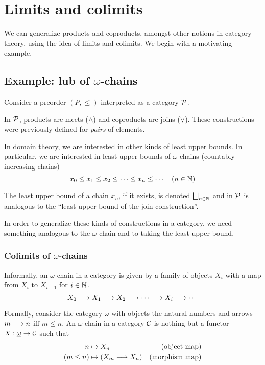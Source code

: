 \chapter{Limits and colimits}

We can generalize products and coproducts, amongst other notions in category
theory, using the idea of limits and colimits. We begin with a motivating
example.

\section{Example: lub of $\omega$-chains}

Consider a preorder $(P, \leq)$ interpreted as a category  $\mathcal{P}$.

In $\mathcal{P}$,  products are meets ($\wedge$) and coproducts are joins
($\vee$). These constructions were previously defined for \emph{pairs} of
elements.

In domain theory, we are interested in other kinds of least upper bounds. In
particular, we are interested in least upper bounds of $\omega$-chains
(countably increasing chains)
\[
	x_0 \leq x_1 \leq x_2 \leq \cdots \leq x_n \leq \cdots \quad (n \in \mathbb{N})
\]

The least upper bound of a chain $x_n$, if it exists, is denoted $\bigsqcup_{n \in
    \mathbb{N}}$ and in $\mathcal{P}$ is analogous to the ``least upper bound of the
join construction''.

In order to generalize these kinds of constructions in a category, we need
something analogous to the $\omega$-chain and to taking the least upper bound.

\subsection{Colimits of $\omega$-chains}

\begin{definition}
Informally, an $\omega$-chain in a category is given by a family of objects
$X_i$ with a map from $X_i$ to $X_{i+1}$ for $i \in \mathbb{N}$.
\[
    X_0 \longrightarrow X_1 \longrightarrow X_2 \longrightarrow \cdots \longrightarrow X_i
    \longrightarrow \cdots
\]

Formally, consider the category $\underline{\omega}$ with objects the natural
numbers and arrows $m \longrightarrow n$ iff $m \leq n$. An $\omega$-chain in a
category $\mathcal{C}$ is nothing but a functor $X : \underline{\omega} \to
\mathcal{C}$ such that
\begin{align*}
	n & \mapsto X_n & (\text{object map}) \\
	(m \leq n) & \mapsto (X_m \longrightarrow X_n) &(\text{morphism map})
\end{align*}

\end{definition}


